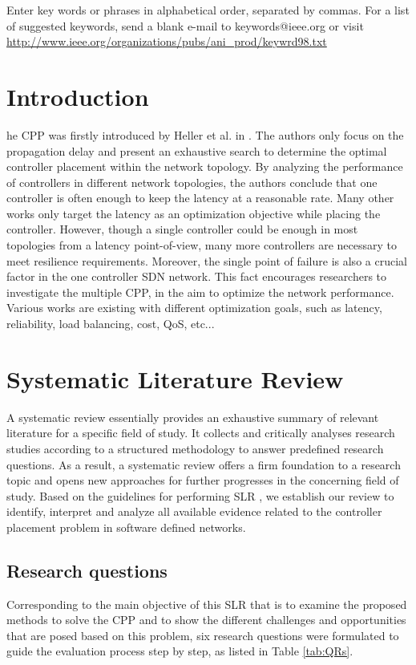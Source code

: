\documentclass{IEEEtran}
\begin{document}
\begin{IEEEkeywords}
Enter key words or phrases in alphabetical 
order, separated by commas. For a list of suggested keywords, send a blank 
e-mail to keywords@ieee.org or visit \underline
{http://www.ieee.org/organizations/pubs/ani\_prod/keywrd98.txt}
\end{IEEEkeywords}

\section{Introduction}
\label{sec:introduction}
he CPP was firstly introduced by Heller et al. in \cite{HeSh12}. The authors only focus on the propagation delay and present an exhaustive search to determine the optimal controller placement within the network topology. By analyzing the performance of controllers in different network topologies, the authors conclude that one controller is often enough to keep the latency at a reasonable rate. Many other works only target the latency as an optimization objective while placing the controller. However, though a single controller could be enough in most topologies \cite{HeSh12} from a latency point-of-view, many more controllers are necessary to meet resilience requirements. Moreover, the single point of failure is also a crucial factor in the one controller SDN network. This fact encourages researchers to investigate the multiple CPP, in the aim to optimize the network performance. Various works are existing with different optimization goals, such as latency, reliability, load balancing, cost, QoS, etc... 

\section{Systematic Literature Review}
A systematic review essentially provides an exhaustive summary of relevant literature for a specific field of study. It collects and critically analyses research studies according to a structured methodology to answer predefined research questions. As a result, a systematic review offers a firm foundation to a research topic and opens new approaches for further progresses in the concerning field of study. Based on the guidelines for performing SLR \cite{KiCh07}, we establish our review to identify, interpret and analyze all available evidence related to the controller placement problem in software defined networks.

\subsection{Research questions}
Corresponding to the main objective of this SLR that is to examine the proposed methods to solve the CPP and to show the different challenges and opportunities that are posed based on this problem, six research questions were formulated to guide the evaluation process step by step, as listed in Table \ref{tab:QRs}.
\end{document}
